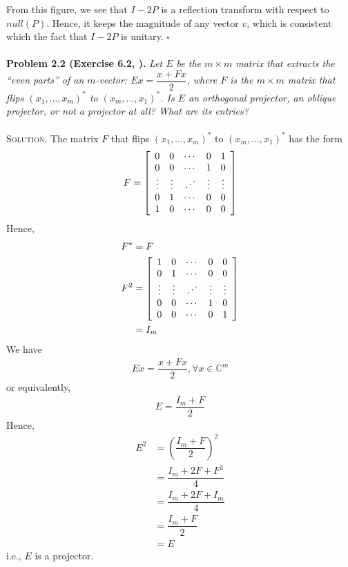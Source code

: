 \documentclass[a4paper,oneside]{book}
\numberwithin{equation}{chapter}
\begin{document}
From this figure, we see that $I-2P$ is a reflection transform with respect to $null\left(P\right)$. Hence, it keeps the magnitude of any vector $v$, which is consistent which the fact that $I-2P$ is unitary. \hfill $\square$\\
\\
\textbf{Problem 2.2 (Exercise 6.2, \cite{1}).} \textit{Let $E$ be the $m \times m$ matrix that extracts the ``even parts'' of an $m$-vector: $Ex = \dfrac{{x + Fx}}{2}$, where $F$ is the $m \times m$ matrix that flips ${\left( {{x_1}, \ldots ,{x_m}} \right)^*}$ to ${\left( {{x_m}, \ldots ,{x_1}} \right)^*}$. Is $E$ an orthogonal projector, an oblique projector, or not a projector at all? What are its entries?}\\
\\
\textsc{Solution.} The matrix $F$ that flips $\left(x_1,\ldots,x_m\right)^*$ to $\left(x_m,\ldots,x_1\right)^*$ has the form
\begin{align}
F = \left[ {\begin{array}{*{20}{c}}
0&0& \cdots &0&1\\
0&0& \cdots &1&0\\
 \vdots & \vdots & {\mathinner{\mkern2mu\raise1pt\hbox{.}\mkern2mu
 \raise4pt\hbox{.}\mkern2mu\raise7pt\hbox{.}\mkern1mu}} & \vdots & \vdots \\
0&1& \cdots &0&0\\
1&0& \cdots &0&0
\end{array}} \right]
\end{align}
Hence,
\begin{align}
F^* &=F\\
{F^2} &= \left[ {\begin{array}{*{20}{c}}
1&0& \cdots &0&0\\
0&1& \cdots &0&0\\
 \vdots & \vdots & {\mathinner{\mkern2mu\raise1pt\hbox{.}\mkern2mu
 \raise4pt\hbox{.}\mkern2mu\raise7pt\hbox{.}\mkern1mu}} & \vdots & \vdots \\
0&0& \cdots &1&0\\
0&0& \cdots &0&1
\end{array}} \right]\\
& = {I_m}
\end{align}
We have
\begin{align}
\label{1.9}
Ex = \dfrac{{x + Fx}}{2},\forall x \in \mathbb{C}^m
\end{align}
or equivalently,
\begin{align}
E = \dfrac{{{I_m} + F}}{2}
\end{align}
Hence,
\begin{align}
{E^2} &= {\left( {\dfrac{{{I_m} + F}}{2}} \right)^2}\\
& = \dfrac{{{I_m} + 2F + {F^2}}}{4}\\
& = \dfrac{{{I_m} + 2F + {I_m}}}{4}\\
& = \dfrac{{{I_m} + F}}{2}\\
& = E
\end{align}
i.e., $E$ is a projector. 
\end{document}
